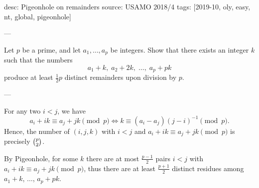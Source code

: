 desc: Pigeonhole on remainders
source: USAMO 2018/4
tags: [2019-10, oly, easy, nt, global, pigeonhole]

---

Let $p$ be a prime, and let $a_1,\ldots,a_p$ be integers. Show that there exists an integer $k$ such that the numbers \[a_1+k,\;a_2+2k,\;\ldots,\;a_p+pk\]
produce at least $\frac12p$ distinct remainders upon division by $p$.

---

For any two $i<j$, we have \[a_i+ik\equiv a_j+jk\pmod p\iff k\equiv(a_i-a_j)(j-i)^{-1}\pmod p.\]
Hence, the number of $(i,j,k)$ with $i<j$ and $a_i+ik\equiv a_j+jk\pmod p$ is precisely $\tbinom p2$.

By Pigeonhole, for some $k$ there are at most $\tfrac{p-1}2$ pairs $i<j$ with $a_i+ik\equiv a_j+jk\pmod p$, thus there are at least $\tfrac{p+1}2$ distinct residues among $a_1+k$, $\ldots$, $a_p+pk$.

